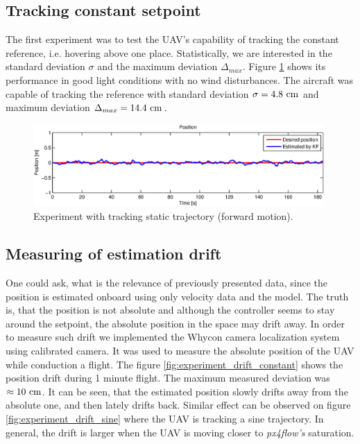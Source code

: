 \subsection{Tracking constant setpoint}
\label{cap:tracking_constant_trajectory}

The first experiment was to test the UAV's capability of tracking the constant reference, i.e. hovering above one place. Statistically, we are interested in the standard deviation $\sigma$ and the maximum deviation $\Delta_{max}$. Figure \ref{fig:experiment_constant_trajectory} shows its performance in good light conditions with no wind disturbances. The aircraft was capable of tracking the reference with standard deviation $\sigma = 4.8~\mathrm{cm}$ and maximum deviation $\Delta_{max} = 14.4~\mathrm{cm}$.

\begin{figure}[H]
\centering
\includegraphics[width=0.99\textwidth]{fig/experiment6_constant_reference.eps}
\caption{Experiment with tracking static trajectory (forward motion).}
\label{fig:experiment_constant_trajectory}
\end{figure}

\subsection{Measuring of estimation drift}

One could ask, what is the relevance of previously presented data, since the position is estimated onboard using only velocity data and the model. The truth is, that the position is not absolute and although the controller seems to stay around the setpoint, the absolute position in the space may drift away. In order to measure such drift we implemented the Whycon camera localization system \citep{faigl2013whycon} using calibrated camera. It was used to measure the absolute position of the UAV while conduction a flight. The figure \ref{fig:experiment_drift_constant} shows the position drift during 1 minute flight. The maximum measured deviation was $\approx 10~\mathrm{cm}$. It can be seen, that the estimated position slowly drifts away from the absolute one, and then lately drifts back. Similar effect can be observed on figure \ref{fig:experiment_drift_sine} where the UAV is tracking a sine trajectory. In general, the drift is larger when the UAV is moving closer to \emph{px4flow's} saturation.

